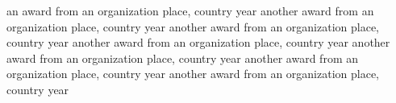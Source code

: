 \begin{cvhonors}
  \cvhonor
    {an award}
    {from an organization}
    {place, country}
    {year}
  \cvhonor
    {another award}
    {from an organization}
    {place, country}
    {year}
  \cvhonor
    {another award}
    {from an organization}
    {place, country}
    {year}
  \cvhonor
    {another award}
    {from an organization}
    {place, country}
    {year}
  \cvhonor
    {another award}
    {from an organization}
    {place, country}
    {year}
  \cvhonor
    {another award}
    {from an organization}
    {place, country}
    {year}
  \cvhonor
    {another award}
    {from an organization}
    {place, country}
    {year}
\end{cvhonors}
